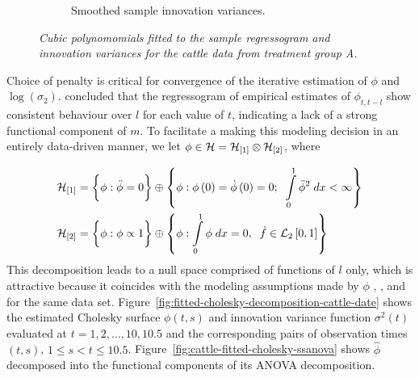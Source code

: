 \begin{figure}[H]
\begin{subfigure}{.48\textwidth}
 \caption{Smoothed sample innovation variances.} 
\label{fig:cattleA-innovariogram-cubic-smooth}
 \end{subfigure}
 \caption{\textit{Cubic polynomomials fitted to the sample regressogram and innovation variances for the cattle data from treatment group A.}} \label{fig:cattleA-smoothed-regressogram-variogram}
\end{figure}

Choice of penalty is critical for convergence of the iterative estimation of $\phi$ and $\log\left(\sigma_2 \right)$. \cite{pan2017jmcm} concluded that the regressogram of empirical estimates of $\phi_{t,t-l}$ show consistent behaviour over $l$ for each value of $t$, indicating a lack of a strong functional component of $m$. To facilitate a making this modeling decision in an entirely data-driven manner, we let $\phi \in \mathcal{H} = \mathcal{H}_{\left[1\right]} \otimes \mathcal{H}_{\left[2\right]}$, where 

\begin{align*} 
\mathcal{H}_{\left[1\right]} &= \bigg\{ \phi: \ddot{\phi} = 0 \bigg\} \oplus \left\{\phi: \phi\left(0\right) = \dot{\phi}\left(0\right) = 0; \;\; \int\limits_0^1 \ddot{\phi}^2 \;dx < \infty \right\} \\
\mathcal{H}_{\left[2\right]} &= \bigg\{ \phi: \phi \propto 1 \bigg\} \oplus \left\{ \phi: \int\limits_0^1 \phi \;dx = 0, \;\; \dot{f} \in \mathcal{L}_2\left[0,1\right]  \right\} 
\end{align*} 
\noindent
This decomposition leads to a null space comprised of functions of $l$ only, which is attractive because it coincides with the modeling assumptions made by $\phi$ \cite{pan2017jmcm}, \cite{huang2006covariance}, and \cite{wu2003nonparametric} for the same data set.  Figure~\ref{fig:fitted-cholesky-decomposition-cattle-date} shows the estimated Cholesky surface $\phi\left( t,s\right)$ and innovation variance function $\sigma^2\left(t\right)$ evaluated at $t = 1, 2, \dots, 10, 10.5$ and the corresponding pairs of observation times $\left(t,s\right)$, $1 \le s < t \le 10.5$. Figure~\ref{fig:cattle-fitted-cholesky-ssanova} shows $\hat{\phi}$ decomposed into the functional components of its ANOVA decomposition.

